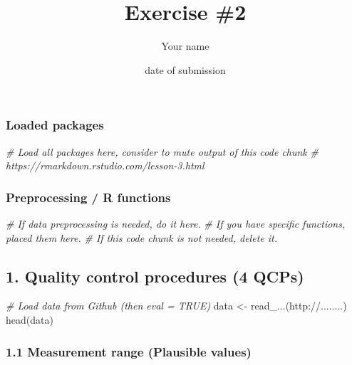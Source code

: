 \documentclass[
]{article}
\title{Exercise \#2}
\author{Your name}
\date{date of submission}
\newenvironment{Shaded}{\begin{snugshade}}{\end{snugshade}}
\newcommand{\CommentTok}[1]{\textcolor[rgb]{0.56,0.35,0.01}{\textit{#1}}}
\newcommand{\FunctionTok}[1]{\textcolor[rgb]{0.00,0.00,0.00}{#1}}
\newcommand{\NormalTok}[1]{#1}
\newcommand{\OtherTok}[1]{\textcolor[rgb]{0.56,0.35,0.01}{#1}}
\newcommand{\StringTok}[1]{\textcolor[rgb]{0.31,0.60,0.02}{#1}}
\begin{document}
\maketitle

\hypertarget{loaded-packages}{%
\subsubsection{Loaded packages}\label{loaded-packages}}

\begin{Shaded}
\begin{Highlighting}[]
\CommentTok{\# Load all packages here, consider to mute output of this code chunk}
\CommentTok{\# https://rmarkdown.rstudio.com/lesson{-}3.html}
\end{Highlighting}
\end{Shaded}

\hypertarget{preprocessing-r-functions}{%
\subsubsection{Preprocessing / R
functions}\label{preprocessing-r-functions}}

\begin{Shaded}
\begin{Highlighting}[]
\CommentTok{\# If data preprocessing is needed, do it here.}
\CommentTok{\# If you have specific functions, placed them here.}
\CommentTok{\# If this code chunk is not needed, delete it.}
\end{Highlighting}
\end{Shaded}

\hypertarget{quality-control-procedures-4-qcps}{%
\subsection{1. Quality control procedures (4
QCPs)}\label{quality-control-procedures-4-qcps}}

\begin{Shaded}
\begin{Highlighting}[]
\CommentTok{\# Load data from Github (then eval = TRUE)}
\NormalTok{data }\OtherTok{\textless{}{-}} \FunctionTok{read\_...}\NormalTok{(}\StringTok{\textquotesingle{}http://........\textquotesingle{}}\NormalTok{)}
\FunctionTok{head}\NormalTok{(data)}
\end{Highlighting}
\end{Shaded}

\hypertarget{measurement-range-plausible-values}{%
\subsubsection{1.1 Measurement range (Plausible
values)}\label{measurement-range-plausible-values}}
\end{document}
